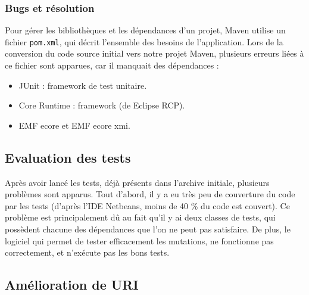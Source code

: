\documentclass[a4paper]{article}
\begin{document}
		\vspace{0.5cm}

		\subsubsection{Bugs et résolution}

		\vspace{0.5cm}

		Pour gérer les bibliothèques et les dépendances d'un projet, Maven utilise un fichier \texttt{pom.xml}, qui décrit l'ensemble des besoins de l'application. Lors de la conversion du code source initial vers notre projet Maven, plusieurs erreurs liées à ce fichier sont apparues, car il manquait des dépendances :
		\begin{itemize}
			\item JUnit : framework de test unitaire.
			\item Core Runtime : framework (de Eclipse RCP).
			\item EMF ecore et EMF ecore xmi.
		\end{itemize}

		\vspace{0.5cm}



		\subsection{Evaluation des tests}

		\vspace{0.5cm}

		Après avoir lancé les tests, déjà présents dans l'archive initiale, plusieurs problèmes sont apparus. Tout d'abord, il y a eu très peu de couverture du code par les tests (d'après l'IDE Netbeans, moins de 40 \% du code est couvert). Ce problème est principalement dû au fait qu'il y ai deux classes de tests, qui possèdent chacune des dépendances que l'on ne peut pas satisfaire. De plus, le logiciel qui permet de tester efficacement les mutations, ne fonctionne pas correctement, et n'exécute pas les bons tests.

	\newpage

	\begin{center}
		\section{Amélioration de URI}
	\end{center}
\end{document}
